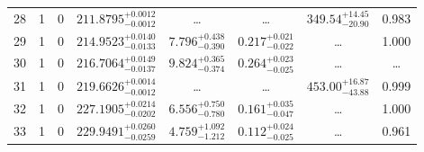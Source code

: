 \begin{table*}[!]
\begin{tabular}{llcrrlrc}
28 & 1 & 0 & $    211.8795_{-      0.0012}^{+      0.0012}$ & \multicolumn{1}{c}{\dots} & \multicolumn{1}{c}{\dots} & $      349.54_{-       20.90}^{+       14.45}$ & 0.983\\[1pt]
29 & 1 & 0 & $    214.9523_{-      0.0133}^{+      0.0140}$ & $       7.796_{-       0.390}^{+       0.438}$ & $       0.217_{-       0.022}^{+       0.021}$ & \multicolumn{1}{c}{\dots} & 1.000 \\[1pt]
30 & 1 & 0 & $    216.7064_{-      0.0137}^{+      0.0149}$ & $       9.824_{-       0.374}^{+       0.365}$ & $       0.264_{-       0.025}^{+       0.023}$ & \multicolumn{1}{c}{\dots} & \dots \\[1pt]
31 & 1 & 0 & $    219.6626_{-      0.0012}^{+      0.0014}$ & \multicolumn{1}{c}{\dots} & \multicolumn{1}{c}{\dots} & $      453.00_{-       43.88}^{+       16.87}$ & 0.999\\[1pt]

32 & 1 & 0 & $    227.1905_{-      0.0202}^{+      0.0214}$ & $       6.556_{-       0.780}^{+       0.750}$ & $       0.161_{-       0.047}^{+       0.035}$ & \multicolumn{1}{c}{\dots} & 1.000\\[1pt]
33 & 1 & 0 &  $    229.9491_{-      0.0259}^{+      0.0260}$ & $       4.759_{-       1.212}^{+       1.092}$ & $       0.112_{-       0.025}^{+       0.024}$ & \multicolumn{1}{c}{\dots} & 0.961\\[1pt]

\hline
\end{tabular}
\end{table*}


